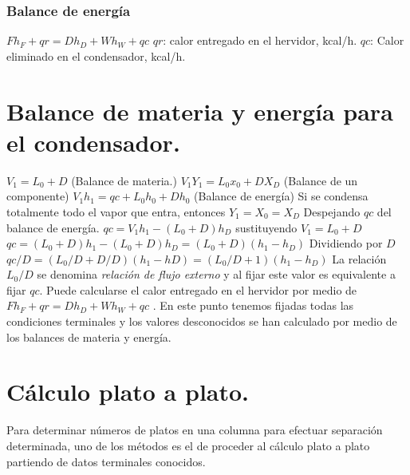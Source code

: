 \documentclass[11pt,openany]{book}
\begin{document}
\subsubsection{Balance de energía}
$F h_F +qr = D h_D + W h_W + qc$
\newline\newline
$qr$: calor entregado en el hervidor, kcal/h.
$qc$: Calor eliminado en el condensador, kcal/h.
\section{Balance de materia y energía para el condensador.}
$V_1 = L_0 + D$ (Balance de materia.)
\newline\newline
$V_1 Y_1= L_0 x_0 + D X_D$ (Balance de un componente)
\newline\newline
$V_1 h_1 = qc + L_0 h_0 + D h_0$ (Balance de energía)
\newline\newline
Si se condensa totalmente todo el vapor que entra, entonces
\newline\newline
$Y_1 = X_0 = X_D$
Despejando $qc$ del balance de energía.
$qc = V_1 h_1 - (L_0+D)h_D$
\newline\newline
sustituyendo $V_1=L_0 +D$
\newline\newline
$qc=(L_0+D)h_1 - (L_0+D)h_D = (L_0+D)(h_1-h_D)$
\newline\newline
Dividiendo por $D$
\newline\newline
$qc/D = (L_0/D + D/D)(h_1-hD)=(L_0/D +1)(h_1-h_D)$
\newline\newline
La relación $L_0/D$ se denomina \textit{relación de flujo externo} y al fijar este valor es equivalente a 
fijar $qc$. Puede calcularse el calor entregado en el hervidor por medio de 
$F h_F + qr = D h_D + W h_W + qc$ . En este punto tenemos fijadas todas las condiciones terminales y los valores 
desconocidos se han calculado por medio de los balances de materia y energía.
\section{Cálculo plato a plato.}
Para determinar números de platos en una columna para efectuar separación determinada, uno 
de los métodos es el de proceder al cálculo plato a plato partiendo de datos terminales conocidos.
\end{document}
